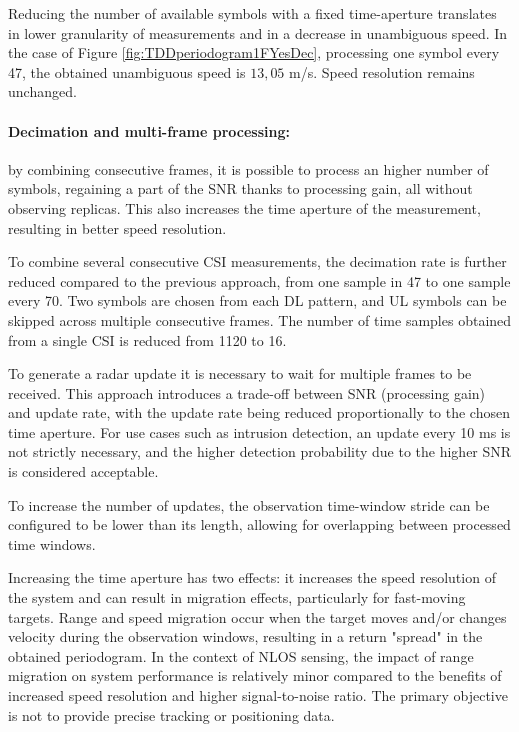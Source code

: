 		     Reducing the number of available symbols with a fixed time-aperture translates in lower granularity of measurements and in a decrease in unambiguous speed. \protect\newline In the case of Figure \ref{fig:TDDperiodogram1FYesDec}, processing one symbol every 47, the obtained unambiguous speed is $13,05$ m/s. \protect\newline Speed resolution remains unchanged.
		    
		     \paragraph{Decimation and multi-frame processing:}
		     by combining consecutive frames, it is possible to process an higher number of symbols, regaining a part of the SNR thanks to processing gain, all without observing replicas. 
		     This also increases the time aperture of the measurement, resulting in better speed resolution.
		     
			 To combine several consecutive CSI measurements, the decimation rate is further reduced compared to the previous approach, from one sample in 47 to one sample every 70. 
			 Two symbols are chosen from each DL pattern, and UL symbols can be skipped across multiple consecutive frames.
			 The number of time samples obtained from a single CSI is reduced from 1120 to 16.
			 
			 To generate a radar update it is necessary to wait for multiple frames to be received.
			 This approach introduces a trade-off between SNR (processing gain) and update rate, with the update rate being reduced proportionally to the chosen time aperture.
		     For use cases such as intrusion detection, an update every 10 ms is not strictly necessary, and the higher detection probability due to the higher SNR is considered acceptable.
		          
		     To increase the number of updates, the observation time-window stride can be configured to be lower than its length, allowing for overlapping between processed time windows.
		      
		     Increasing the time aperture has two effects: it increases the speed resolution of the system and can result in migration effects, particularly for fast-moving targets. 
		     Range and speed migration occur when the target moves and/or changes velocity during the observation windows, resulting in a return "spread" in the obtained periodogram.
		     In the context of NLOS sensing, the impact of range migration on system performance is relatively minor compared to the benefits of increased speed resolution and higher signal-to-noise ratio. The primary objective is not to provide precise tracking or positioning data.
			
